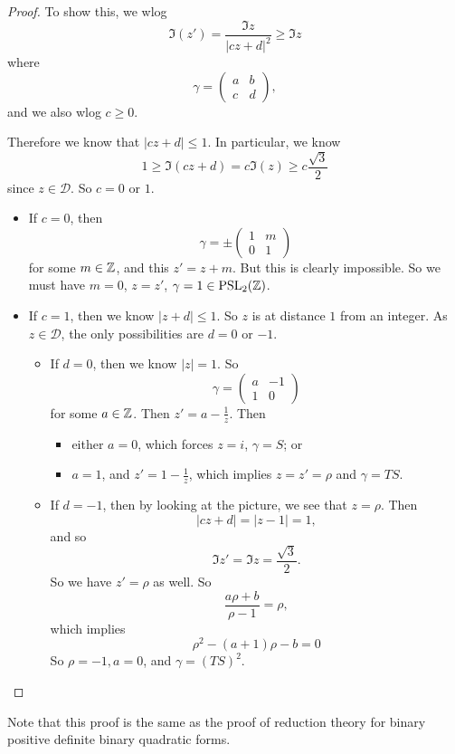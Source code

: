 \documentclass[a4paper]{article}
\begin{document}
\begin{proof}
  To show this, we wlog
  \[
    \Im (z') = \frac{\Im z}{|cz + d|^2} \geq \Im z
  \]
  where
  \[
    \gamma =
    \begin{pmatrix}
      a & b\\
      c & d
    \end{pmatrix},
  \]
  and we also wlog $c \geq 0$.

  Therefore we know that $|cz + d| \leq 1$. In particular, we know
  \[
    1 \geq \Im(cz + d) = c \Im (z) \geq c \frac{\sqrt{3}}{2}
  \]
  since $z \in \mathcal{D}$. So $c = 0$ or $1$.

  \begin{itemize}
    \item If $c = 0$, then
      \[
        \gamma = \pm
        \begin{pmatrix}
          1 & m\\
          0 & 1
        \end{pmatrix}
      \]
      for some $m \in \mathbb{Z}$, and this $z' = z + m$. But this is clearly impossible. So we must have $m = 0$, $z = z'$, $\gamma = 1 \in \mathrm{PSL}_2(\mathbb{Z})$.

    \item If $c = 1$, then we know $|z + d| \leq 1$. So $z$ is at distance $1$ from an integer. As $z \in \mathcal{D}$, the only possibilities are $d = 0$ or $-1$.

      \begin{itemize}
        \item If $d = 0$, then we know $|z| = 1$. So
          \[
            \gamma =
            \begin{pmatrix}
              a & -1\\
              1 & 0
            \end{pmatrix}
          \]
          for some $a \in \mathbb{Z}$. Then $z' = a - \frac{1}{z}$. Then
          \begin{itemize}
            \item either $a = 0$, which forces $z = i$, $\gamma = S$; or
            \item $a = 1$, and $z' = 1 - \frac{1}{z}$, which implies $z = z' = \rho$ and $\gamma = TS$.
          \end{itemize}
        \item If $d = -1$, then by looking at the picture, we see that $z = \rho$. Then
          \[
            |cz + d| = |z - 1| = 1,
          \]
          and so
          \[
            \Im z' = \Im z = \frac{\sqrt{3}}{2}.
          \]
          So we have $z' = \rho$ as well. So
          \[
            \frac{a \rho + b}{\rho - 1} = \rho,
          \]
          which implies
          \[
            \rho^2 - (a + 1) \rho - b = 0
          \]
          So $\rho = -1, a = 0$, and $\gamma = (TS)^2$.\qedhere
      \end{itemize}%
  \end{itemize}
\end{proof}
Note that this proof is the same as the proof of reduction theory for binary positive definite binary quadratic forms.
\end{document}
